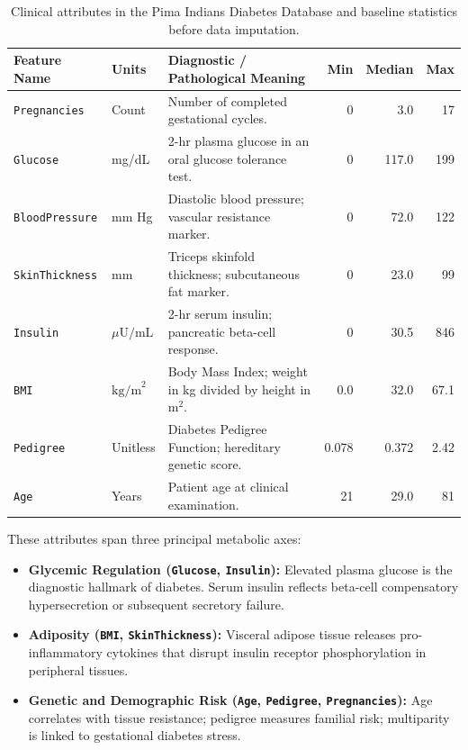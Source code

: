 \documentclass{report}
\begin{document}
\begin{table}[htbp]
\centering
\footnotesize
\renewcommand{\arraystretch}{0.80}
\begin{tabularx}{\textwidth}{l l X r r r}
\toprule
\textbf{Feature Name} & \textbf{Units} & \textbf{Diagnostic / Pathological Meaning} & \textbf{Min} & \textbf{Median} & \textbf{Max} \\
\midrule
\texttt{Pregnancies} & Count & Number of completed gestational cycles. & 0 & 3.0 & 17 \\
\texttt{Glucose} & mg/dL & 2-hr plasma glucose in an oral glucose tolerance test. & 0 & 117.0 & 199 \\
\texttt{BloodPressure} & mm Hg & Diastolic blood pressure; vascular resistance marker. & 0 & 72.0 & 122 \\
\texttt{SkinThickness} & mm & Triceps skinfold thickness; subcutaneous fat marker. & 0 & 23.0 & 99 \\
\texttt{Insulin} & $\mu\text{U/mL}$ & 2-hr serum insulin; pancreatic beta-cell response. & 0 & 30.5 & 846 \\
\texttt{BMI} & $\text{kg/m}^2$ & Body Mass Index; weight in kg divided by height in $\text{m}^2$. & 0.0 & 32.0 & 67.1 \\
\texttt{Pedigree} & Unitless & Diabetes Pedigree Function; hereditary genetic score. & 0.078 & 0.372 & 2.42 \\
\texttt{Age} & Years & Patient age at clinical examination. & 21 & 29.0 & 81 \\
\bottomrule
\end{tabularx}
\caption[Clinical Attributes and Baseline Statistics in PIDD]{Clinical attributes in the Pima Indians Diabetes Database and baseline statistics before data imputation.}
\label{tab:clinical_features}
\end{table}

These attributes span three principal metabolic axes:
\begin{itemize}
    \setlength{\itemsep}{0pt}
    \setlength{\parskip}{0pt}
    \item \textbf{Glycemic Regulation (\texttt{Glucose}, \texttt{Insulin}):} Elevated plasma glucose is the diagnostic hallmark of diabetes. Serum insulin reflects beta-cell compensatory hypersecretion or subsequent secretory failure.
    \item \textbf{Adiposity (\texttt{BMI}, \texttt{SkinThickness}):} Visceral adipose tissue releases pro-inflammatory cytokines that disrupt insulin receptor phosphorylation in peripheral tissues.
    \item \textbf{Genetic and Demographic Risk (\texttt{Age}, \texttt{Pedigree}, \texttt{Pregnancies}):} Age correlates with tissue resistance; pedigree measures familial risk; multiparity is linked to gestational diabetes stress.
\end{itemize}
\end{document}
